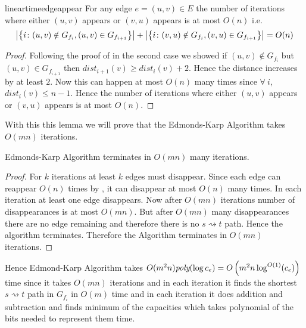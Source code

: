 \begin{lemma}{}{lineartimeedgeappear}
	For any edge $e=(u,v)\in E$ the number of iterations where either $(u,v)$ appears or $(v,u)$ appears is at most $O(n)$ i.e. $$\left|\left\{i\colon (u,v)\notin G_{f_i}, (u,v)\in G_{f_{i+1}}\right\}\right|+\left|\left\{i\colon (v,u)\notin G_{f_i}, (v,u)\in G_{f_{i+1}}\right\}\right|=O(n)$$
\end{lemma}
\begin{proof}
	Following the proof of   in the second case we showed if $(u,v)\notin G_{f_i}$ but $(u,v)\in G_{f_{i+1}}$ then $\textit{dist}_{i+1}(v)\geq \textit{dist}_i(v)+2$. Hence the distance increases by at least $2$. Now this can happen at most $O(n)$ many times since $\forall\ i$, $\textit{dist}_i(v)\leq n-1$. Hence the number of iterations where either $(u,v)$ appears or $(v,u)$ appears is at most $O(n)$.
\end{proof}

With this this lemma we will prove that the Edmonds-Karp Algorithm takes $O(mn)$ iterations. 
\begin{Theorem}{}{}
	Edmonds-Karp Algorithm terminates in $O(mn)$ many iterations. 
\end{Theorem}
\begin{proof}
	For $k$ iterations at least $k$ edges must disappear. Since each edge can reappear $O(n)$ times by , it can disappear at most $O(n)$ many times. In each iteration at least one edge disappears. Now after $O(mn)$ iterations number of disappearances is at most $O(mn)$. But after $O(mn)$ many disappearances  there are no edge remaining and therefore there is no $s\rightsquigarrow t$ path. Hence the algorithm terminates. Therefore the Algorithm terminates in $O(mn)$ iterations.
\end{proof}

Hence Edmond-Karp Algorithm takes $O(m^2n)\textit{poly}(\log c_e)=O\left(m^2n\log^{O(1)}(c_e)\right)$ time since it takes $O(mn)$ iterations and in each iteration it finds the shortest $s\rightsquigarrow t$ path in $G_{f_i}$ in $O(m)$ time and in each iteration it does addition and subtraction and finds minimum of the capacities which takes polynomial of the bits needed to represent them time.
